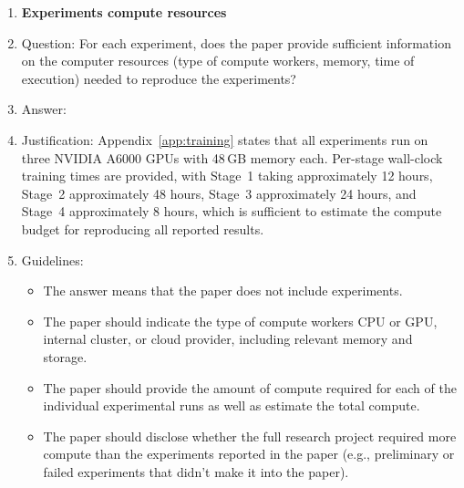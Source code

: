 \begin{enumerate}
\item {\bf Experiments compute resources}
    \item[] Question: For each experiment, does the paper provide sufficient information on the computer resources (type of compute workers, memory, time of execution) needed to reproduce the experiments?
    \item[] Answer: \answerYes{}
    \item[] Justification: Appendix~\ref{app:training} states that all experiments run on three NVIDIA A6000 GPUs with 48\,GB memory each. Per-stage wall-clock training times are provided, with Stage~1 taking approximately 12 hours, Stage~2 approximately 48 hours, Stage~3 approximately 24 hours, and Stage~4 approximately 8 hours, which is sufficient to estimate the compute budget for reproducing all reported results.
    \item[] Guidelines:
    \begin{itemize}
        \item The answer \answerNA{} means that the paper does not include experiments.
        \item The paper should indicate the type of compute workers CPU or GPU, internal cluster, or cloud provider, including relevant memory and storage.
        \item The paper should provide the amount of compute required for each of the individual experimental runs as well as estimate the total compute.
        \item The paper should disclose whether the full research project required more compute than the experiments reported in the paper (e.g., preliminary or failed experiments that didn't make it into the paper).
    \end{itemize}


\end{enumerate}
